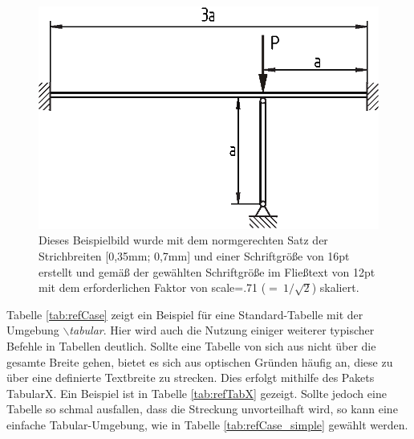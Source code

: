 \begin{figure}[t!]
\centering
\includegraphics[scale=0.71]{pictures/Beispiel.eps}
\caption{Dieses Beispielbild wurde mit dem normgerechten Satz der Strichbreiten [0,35mm; 0,7mm] und einer Schriftgröße von 16pt erstellt und gemäß der gewählten Schriftgröße im Fließtext von 12pt mit dem erforderlichen Faktor von scale=.71 ($\mathrm{=\:1/\sqrt{2}}$) skaliert.}
\label{fig:Bsp_Zeichung}
\end{figure}
%
Tabelle \ref{tab:refCase} zeigt ein Beispiel für eine Standard-Tabelle mit der Umgebung \emph{$\backslash$tabular}. Hier wird auch die Nutzung einiger weiterer typischer Befehle in Tabellen deutlich. Sollte eine Tabelle von sich aus nicht über die gesamte Breite gehen, bietet es sich aus optischen Gründen häufig an, diese zu über eine definierte Textbreite zu strecken. Dies erfolgt mithilfe des Pakets TabularX. Ein Beispiel ist in Tabelle \ref{tab:refTabX} gezeigt. Sollte jedoch eine Tabelle so schmal ausfallen, dass die Streckung unvorteilhaft wird, so kann eine einfache Tabular-Umgebung, wie in Tabelle \ref{tab:refCase_simple} gewählt werden.

